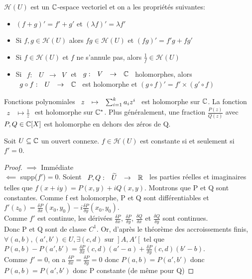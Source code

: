 \documentclass[]{report}
\begin{document}
\begin{prop}{}{}
    $\mathcal{H}(U)$ est un $\mathbb{C}$-espace vectoriel et on a les propriétés suivantes:
    \begin{itemize}
        \item $(f+g)'=f'+g'$ et $(\lambda f)'=\lambda f'$
        \item Si $f,g \in \mathcal{H}(U)$ alors $fg\in \mathcal{H}(U)$ et $(fg)'=f'g+fg'$
        \item Si $f\in \mathcal{H}(U)$ et $f$ ne s'annule pas, alors $\frac{1}{f} \in \mathcal{H}(U)$
        \item Si $\begin{array}{ccccc} f : & U & \to & V \end{array}$ et $\begin{array}{ccccc} g : & V & \to & \mathbb{C} \end{array}$ holomorphes, alors $\begin{array}{ccccc} g \circ f : & U & \to & \mathbb{C} \end{array}$ est holomorphe et $(g \circ f)'=f'\times(g' \circ f)$
    \end{itemize}
\end{prop}

\begin{ex}{}{}
    Fonctions polynomiales $\begin{array}{ccccc} z & \mapsto & \sum_{i=1}^{k} a_i z^i \end{array}$ est holomorphe sur $\mathbb{C}$. La fonction $\begin{array}{ccccc}z & \mapsto  \frac{1}{z}\end{array}$ est holomorphe sur $\mathbb{C}^*$. Plus généralement, une fraction $\frac{P(z)}{Q(z)}$ avec $P,Q\in \mathbb{C}[X]$ est holomorphe en dehors des zéros de Q.
\end{ex}

\begin{prop}{}{}
    Soit $U\subseteq \mathbb{C}$ un ouvert connexe. $f\in \mathcal{H}(U)$ est constante si et seulement si $f'=0$.
\end{prop}

\begin{proof}{}{}
    $\implies$ Immédiate \\
    $\impliedby$ supp($f'$)$=0$. Soient $\begin{array}{ccccc} P,Q : & \widetilde{U} & \to & \mathbb{R} \end{array}$ les parties réelles et imaginaires telles que $f(x+iy)=P(x,y)+iQ(x,y)$. Montrons que P et Q sont constantes. Comme f est holomorphe, P et Q sont différentiables et $f'(z_0)=\frac{\delta P}{\delta x}(x_0,y_0)-i\frac{\delta P}{\delta y}(x_0,y_0)$.\\
    Comme $f'$ est continue, les dérivées $\frac{\delta P}{\delta x}$, $\frac{\delta P}{\delta y}$, $\frac{\delta Q}{\delta x}$ et $\frac{\delta Q}{\delta y}$ sont continues.\\
    Donc P et Q sont de classe $C^1$. Or, d'après le théorème des accroissements finis, $\forall(a,b),(a',b')\in U, \exists(c,d)\text{ sur }\left. \right]A,A'\left[ \right.$ tel que\\
    $P(a,b)-P(a',b')=\frac{\delta P}{\delta x}(c,d)(a'-a)+\frac{\delta P}{\delta y}(c,d)(b'-b)$.\\
    Comme $f'=0$, on a $\frac{\delta P}{\delta x}=\frac{\delta P}{\delta y}=0$ donc $P(a,b)=P(a',b')$ donc $P(a,b)=P(a',b')$ donc P constante (de même pour Q)
\end{proof}
\end{document}
